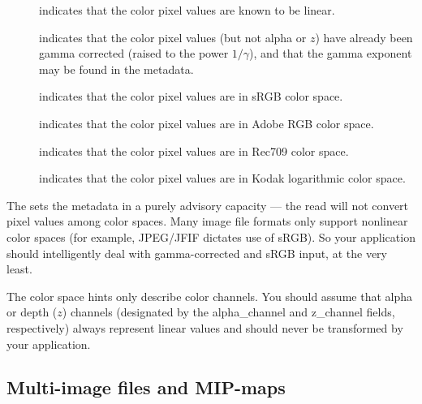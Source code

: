 \begin{description}
\item[\halfspc \rm {}] indicates that the
  color pixel values are known to be linear.
\item[\halfspc \rm {}] indicates
  that the color pixel values (but not alpha or $z$) have
  already been gamma corrected (raised to the power $1/\gamma$), and
  that the gamma exponent may be found in the  metadata.
\item[\halfspc \rm {}] indicates that the
  color pixel values are in sRGB color space.
\item[\halfspc \rm {}] indicates that the
  color pixel values are in Adobe RGB color space.
\item[\halfspc \rm {}] indicates that the
  color pixel values are in Rec709 color space.
\item[\halfspc \rm {}] indicates that the
  color pixel values are in Kodak logarithmic color space.
\end{description}

The \ImageInput sets the  metadata in a
purely advisory capacity --- the {\cf read} will not convert pixel
values among color spaces.  Many image file formats only support
nonlinear color spaces (for example, JPEG/JFIF dictates use of sRGB).
So your application should intelligently deal with gamma-corrected and
sRGB input, at the very least.

The color space hints only describe color channels.  You should assume that
alpha or depth ($z$) channels (designated by the {\cf alpha_channel} and
{\cf z_channel} fields, respectively) always represent linear values and
should never be transformed by your application.


%


%


\subsection{Multi-image files and MIP-maps}
\label{sec:imageinput:multiimage}
\label{sec:imageinput:mipmap}

